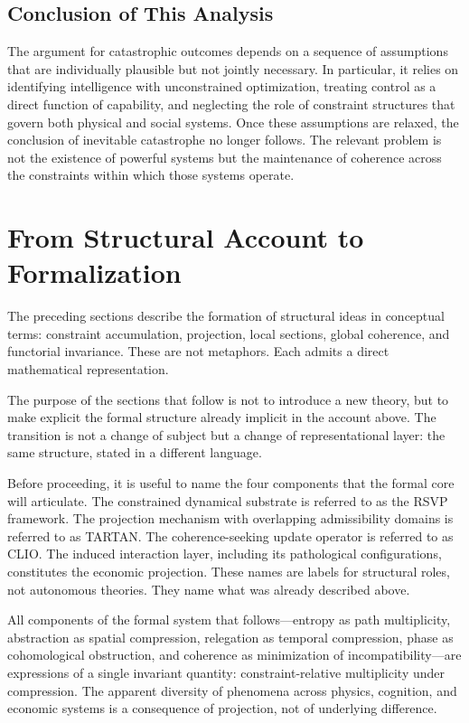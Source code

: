 \documentclass[11pt]{article}
\theoremstyle{plain}
\theoremstyle{definition}
\theoremstyle{remark}
\begin{document}
\subsection{Conclusion of This Analysis}

The argument for catastrophic outcomes depends on a sequence of assumptions
that are individually plausible but not jointly necessary. In particular,
it relies on identifying intelligence with unconstrained optimization,
treating control as a direct function of capability, and neglecting the
role of constraint structures that govern both physical and social systems.
Once these assumptions are relaxed, the conclusion of inevitable catastrophe
no longer follows. The relevant problem is not the existence of powerful
systems but the maintenance of coherence across the constraints within
which those systems operate.


\section{From Structural Account to Formalization}

The preceding sections describe the formation of structural ideas in
conceptual terms: constraint accumulation, projection, local sections,
global coherence, and functorial invariance. These are not metaphors.
Each admits a direct mathematical representation.

The purpose of the sections that follow is not to introduce a new theory,
but to make explicit the formal structure already implicit in the account
above. The transition is not a change of subject but a change of
representational layer: the same structure, stated in a different language.

Before proceeding, it is useful to name the four components that the
formal core will articulate. The constrained dynamical substrate is
referred to as the RSVP framework. The projection mechanism with
overlapping admissibility domains is referred to as TARTAN. The
coherence-seeking update operator is referred to as CLIO. The induced
interaction layer, including its pathological configurations, constitutes
the economic projection. These names are labels for structural roles,
not autonomous theories. They name what was already described above.

All components of the formal system that follows---entropy as path
multiplicity, abstraction as spatial compression, relegation as temporal
compression, phase as cohomological obstruction, and coherence as
minimization of incompatibility---are expressions of a single invariant
quantity: constraint-relative multiplicity under compression. The apparent
diversity of phenomena across physics, cognition, and economic systems is
a consequence of projection, not of underlying difference.
\end{document}
